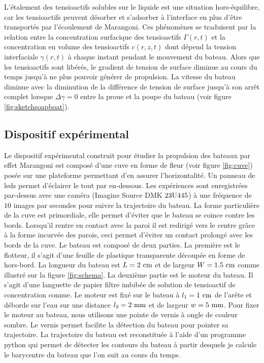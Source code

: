 \documentclass[french, 10pt]{article}
\begin{document}
\noindent L'étalement des tensioactifs solubles sur le liquide est une situation hors-équilibre, car les tensioactifs peuvent désorber et s'adsorber à l'interface en plus d'être transportés par l'écoulement de Marangoni. Ces phénomènes se traduisent par la relation entre la concentration surfacique des tensioactifs $\Gamma(r,t)$ et la concentration en volume des tensioactifs $c(r,z,t)$ dont dépend la tension interfaciale $\gamma(r,t)$ à chaque instant pendant le mouvement du bateau. Alors que les tensioactifs sont libérés, le gradient de tension de surface diminue au cours du temps jusqu'à ne plus pouvoir générer de propulsion. La vitesse du bateau diminue avec la diminution de la différence de tension de surface jusqu'à son arrêt complet lorsque $\Delta\gamma =0$ entre la proue et la poupe du bateau (voir figure \ref{fig:sketchsoapboat}).

\subsection{Dispositif expérimental}

Le dispositif expérimental construit pour étudier la propulsion des bateaux par effet Marangoni est composé d'une cuve en forme de fleur (voir figure \ref{fig:cuve}) posée sur une plateforme permettant d'en assurer l'horizontalité. Un panneau de leds permet d'éclairer le tout par en-dessous. Les expériences sont enregistrées par-dessus avec une caméra (Imagine Source DMK $\rm 23U445$) à une fréquence de $10$ images par secondes pour suivre la trajectoire du bateau. La forme particulière de la cuve est primordiale, elle permet d'éviter que le bateau se coince contre les bords. Lorsqu'il rentre en contact avec la paroi il est redirigé vers le centre grâce à la forme incurvée des parois, ceci permet d'éviter un contact prolongé avec les bords de la cuve. Le bateau est composé de deux parties. La première est le flotteur, il s'agit d'une feuille de plastique transparente découpée en forme de hors-bord. La longueur du bateau est $L=2~\rm cm$ et de largeur $W = 1.5~\rm cm$ comme illustré sur la figure \ref{fig:schema}. La deuxième partie est le moteur du bateau. Il s'agit d'une languette de papier filtre imbibée de solution de tensioactif de concentration connue. Le moteur est fixé sur le bateau à $l_1 = 1~\rm cm$ de l'arête et déborde sur l'eau sur une distance $l_2 = 2~\rm mm$ et de largeur $w=5~\rm mm$. Pour fixer le moteur au bateau, nous utilisons une pointe de vernis à ongle de couleur sombre. Le vernis permet facilite la détection du bateau pour pointer sa trajectoire. La trajectoire du bateau est reconstituée à l'aide d'un programme python qui permet de détecter les contours du bateau à partir desquels je calcule le barycentre du bateau que l'on suit au cours du temps.\medskip
\end{document}
